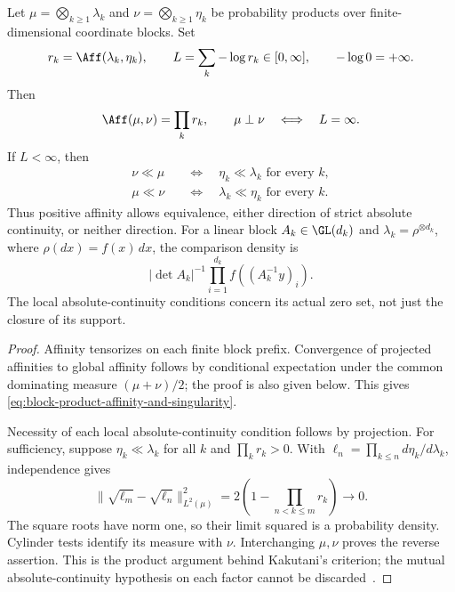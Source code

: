 \begin{theorem}
\label{thm:block-kakutani}
Let \(\mu=\bigotimes_{k\geq1}\lambda_k\) and
\(\nu=\bigotimes_{k\geq1}\eta_k\) be probability products over
finite-dimensional coordinate blocks.
Set
\[
 r_k=\Aff(\lambda_k,\eta_k),\qquad
 L=\sum_k-\log r_k\in[0,\infty],
 \qquad -\log0=+\infty.
\]
Then
\begin{equation}
 \Aff(\mu,\nu)=\prod_kr_k,\qquad
 \mu\perp\nu\quad\Longleftrightarrow\quad L=\infty.
 \label{eq:block-product-affinity-and-singularity}
\end{equation}
If \(L<\infty\), then
\begin{equation}
 \begin{aligned}
  \nu\ll\mu&\quad\Longleftrightarrow\quad
                         \eta_k\ll\lambda_k\text{ for every }k,\\
  \mu\ll\nu&\quad\Longleftrightarrow\quad
                         \lambda_k\ll\eta_k\text{ for every }k.
 \end{aligned}
 \label{eq:block-product-absolute-continuity}
\end{equation}
Thus positive affinity allows equivalence, either direction of strict
absolute continuity, or neither direction.
For a linear block \(A_k\in\GL(d_k)\) and
\(\lambda_k=\rho^{\otimes d_k}\), where \(\rho(dx)=f(x)\,dx\),
the comparison density is
\[
 |\det A_k|^{-1}\prod_{i=1}^{d_k}
                         f((A_k^{-1}y)_i).
\]
The local absolute-continuity conditions concern its actual zero
set, not just the closure of its support.
\end{theorem}
\begin{proof}
Affinity tensorizes on each finite block prefix.
Convergence of projected affinities to global affinity follows by
conditional expectation under the common dominating measure
\((\mu+\nu)/2\); the proof is also given below.
This gives \eqref{eq:block-product-affinity-and-singularity}.

Necessity of each local absolute-continuity condition follows by
projection.
For sufficiency, suppose \(\eta_k\ll\lambda_k\) for all \(k\) and
\(\prod_kr_k>0\).
With \(\ell_n=\prod_{k\leq n}d\eta_k/d\lambda_k\), independence gives
\[
 \|\sqrt{\ell_m}-\sqrt{\ell_n}\|_{L^2(\mu)}^2
       =2\left(1-\prod_{n<k\leq m}r_k\right)\longrightarrow0.
\]
The square roots have norm one, so their limit squared is a
probability density.
Cylinder tests identify its measure with \(\nu\).
Interchanging \(\mu,\nu\) proves the reverse assertion.
This is the product argument behind Kakutani's criterion; the
mutual absolute-continuity hypothesis on each factor cannot be
discarded~\cite{kakutani1948equivalence,shepp1965translate}.
\end{proof}

